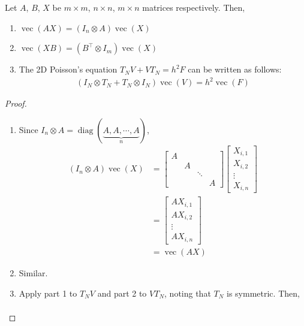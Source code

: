 \documentclass[11pt]{article}
\numberwithin{equation}{section}
\begin{document}
\begin{lemma}
    Let $A$, $B$, $X$ be $m \times m$, $n \times n$, $m \times n$ matrices respectively. Then, \begin{enumerate}
        \item $\operatorname{vec}(AX) = \left( I_n \otimes A \right) \operatorname{vec}(X)$
        \item $\operatorname{vec}(XB) = \left( B^\top \otimes I_m \right) \operatorname{vec}(X)$
        \item  The 2D Poisson's equation $T_N V + V T_N=h^2 F$ can be written as follows: \begin{align*}
            \left( I_N \otimes T_N + T_N \otimes I_N \right) \operatorname{vec}(V) = h^2 \operatorname{vec}(F)
        \end{align*}
    \end{enumerate}
    \begin{proof}
        \begin{enumerate}
            \item Since $I_n \otimes A=\operatorname{diag}\left( \underbrace{A, A, \cdots, A}_n \right)$, \begin{align*}
                \left( I_n \otimes A \right) \operatorname{vec}(X) &= \left[\begin{array}{llll}A & & & \\ & A &  & \\ & & \ddots & \\ & & & A\end{array}\right]
                \left[\begin{array}{c} X_{i, 1} \\ X_{i, 2} \\ \vdots \\ {X}_{i, n}\end{array}\right] \\
                &= \left[\begin{array}{c}A X_{i, 1} \\ AX_{i, 2} \\ \vdots \\ A{X}_{i, n}\end{array}\right] \\
                &= \operatorname{vec}(AX)
            \end{align*}
            \item Similar.
            \item  Apply part 1 to $T_N V$ and part 2 to $V T_N$, noting that $T_N$ is symmetric. Then,\begin{align*}

\end{align*}
\end{enumerate}
\end{proof}
\end{lemma}
\end{document}
